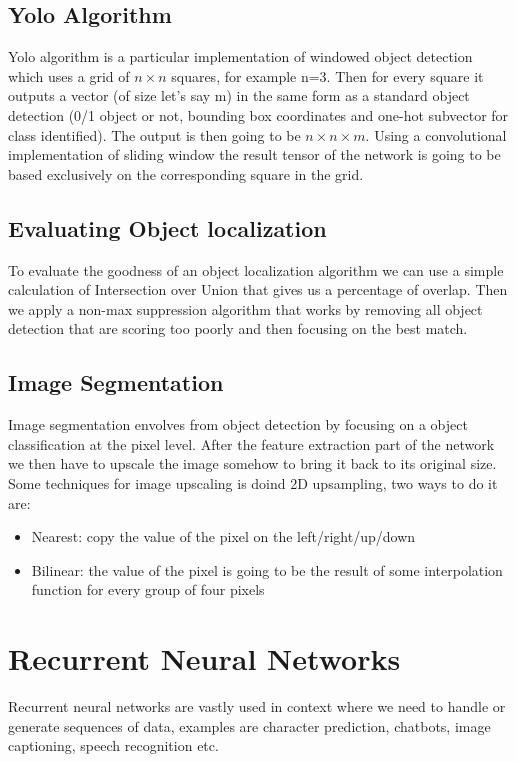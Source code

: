 \documentclass{article}
\begin{document}
\subsection*{Yolo Algorithm}
Yolo algorithm is a particular implementation of windowed object detection which uses a grid of $ n\times n $ squares, for example n=3. Then for every square it outputs a vector (of size let's say m) in the same form as a standard object detection (0/1 object or not, bounding box coordinates and one-hot subvector for class identified). The output is then going to be $n\times n\times m$. Using a convolutional implementation of sliding window the result tensor of the network is going to be based exclusively on the corresponding square in the grid.
\subsection*{Evaluating Object localization}
To evaluate the goodness of an object localization algorithm we can use a simple calculation of Intersection over Union that gives us a percentage of overlap. Then we apply a non-max suppression algorithm that works by removing all object detection that are scoring too poorly and then focusing on the best match. 

\subsection*{Image Segmentation}
Image segmentation envolves from object detection by focusing on a object classification at the pixel level. After the feature extraction part of the network we then have to upscale the image somehow to bring it back to its original size. Some techniques for image upscaling is doind 2D upsampling, two ways to do it are:
\begin{itemize}
    \item Nearest: copy the value of the pixel on the left/right/up/down
    \item Bilinear: the value of the pixel is going to be the result of some interpolation function for every group of four pixels
\end{itemize}

\section*{Recurrent Neural Networks}
Recurrent neural networks are vastly used in context where we need to handle or generate sequences of data, examples are character prediction, chatbots, image captioning, speech recognition etc.
\end{document}
